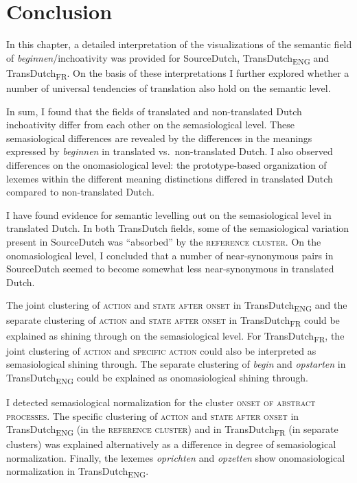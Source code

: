 \section{Conclusion}
\label{sec:4.8}  
In this chapter, a detailed interpretation of the visualizations of the semantic field of \textit{beginnen}/inchoativity was provided for SourceDutch, TransDutch\textsubscript{ENG} and TransDutch\textsubscript{FR}. On the basis of these interpretations I further explored whether a number of universal tendencies of translation also hold on the semantic level. 

In sum, I found that the fields of translated and non-translated Dutch inchoativity differ from each other on the semasiological level. These semasiological differences are revealed by the differences in the meanings expressed by \textit{beginnen} in translated vs.\ non-translated Dutch. I also observed differences on the onomasiological level: the prototype-based organization of lexemes within the different meaning distinctions differed in translated Dutch compared to non-translated Dutch.

I have found evidence for semantic levelling out on the semasiological level in translated Dutch. In both TransDutch fields, some of the semasiological variation present in SourceDutch was ``absorbed'' by the \textsc{reference cluster}. On the onomasiological level, I concluded that a number of near-synonymous pairs in SourceDutch seemed to become somewhat less near-synonymous in translated Dutch.

The joint clustering of \textsc{action} and \textsc{state after onset} in TransDutch\textsubscript{ENG} and the separate clustering of \textsc{action} and \textsc{state after onset} in TransDutch\textsubscript{FR} could be explained as shining through on the semasiological level. For TransDutch\textsubscript{FR}, the joint clustering of \textsc{action} and {\textsc{specific}} \textsc{action} could also be interpreted as semasiological shining through. The separate clustering of \textit{begin} and \textit{opstarten} in TransDutch\textsubscript{ENG} could be explained as onomasiological shining through.

I detected semasiological normalization for the cluster {\textsc{onset of abstract processes}}. The specific clustering of \textsc{action} and \textsc{state after onset} in TransDutch\textsubscript{ENG} (in the \textsc{reference cluster}) and in TransDutch\textsubscript{FR} (in separate clusters) was explained alternatively as a difference in degree of semasiological normalization. Finally, the lexemes \textit{oprichten} and \textit{opzetten} show onomasiological normalization in TransDutch\textsubscript{ENG}.

